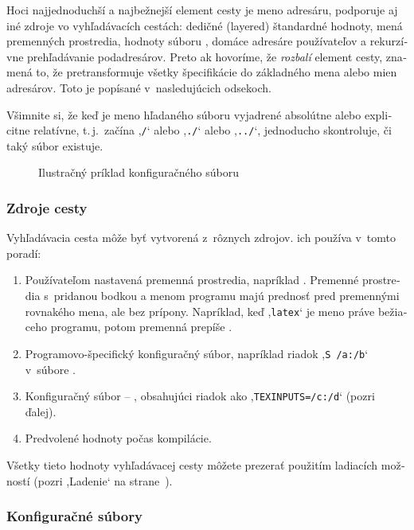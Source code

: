 \documentclass[\classoptions,slovak,english,czech]{\classname}
\newcommand{\singleuv}[1]{,#1`}
\begin{document}
\begin{otherlanguage}{slovak}
Hoci najjednoduchší a najbežnejší element cesty je meno adresáru,
\KPS{} podporuje aj iné zdroje vo vyhľadávacích cestách: dedičné
(layered) štandardné hodnoty, mená premenných prostredia, hodnoty
súboru , domáce adresáre používateľov a rekurzívne
prehľadávanie podadresárov. Preto ak hovoríme, že \KPS{}
\emph{rozbalí} element cesty, znamená to, že pretransformuje všetky
špecifikácie do základného mena alebo mien adresárov. Toto je
popísané v~nasledujúcich odsekoch.

Všimnite si, že keď je meno hľadaného súboru vyjadrené absolútne
alebo explicitne relatívne, t.\,j.\ začína \singleuv{\texttt{/}} alebo \singleuv{\texttt{./}}
alebo \singleuv{\texttt{../}}, \KPS{} jednoducho skontroluje, či taký súbor
existuje.
\ifSingleColumn
\else
\begin{figure*}

\setlength{\abovecaptionskip}{0pt}
  \caption{Ilustračný príklad konfiguračného súboru}
  \label{fig:configsample}
\end{figure*}
\fi

\subsubsection{Zdroje cesty}
\label{sec:pathsources}
Vyhľadávacia cesta môže byť vytvorená z~rôznych zdrojov.
\KPS{} ich používa v~tomto poradí:
\begin{enumerate}
\item
  Používateľom nastavená premenná prostredia, napríklad \@.
  Premenné prostredia s~pridanou bodkou a menom programu majú prednosť pred
premennými rovnakého mena, ale bez prípony.
  Napríklad, keď \singleuv{\texttt{latex}} je meno práve bežiaceho programu, potom
  premenná  prepíše .
\item
  Programovo-špecifický konfiguračný súbor, napríklad riadok
  \singleuv{\texttt{S /a:/b}} v~súbore  .
\item Konfiguračný súbor \KPS{} -- , obsahujúci riadok
  ako \singleuv{\texttt{TEXINPUTS=/c:/d}} (pozri ďalej).
\item Predvolené hodnoty počas kompilácie.
\end{enumerate}
\noindent Všetky tieto hodnoty vyhľadávacej cesty môžete prezerať
použitím ladiacích možností (pozri \singleuv{Ladenie} na
strane~\pageref{sec:debugging}).

\subsubsection{Konfiguračné súbory}


\end{otherlanguage}
\end{document}
